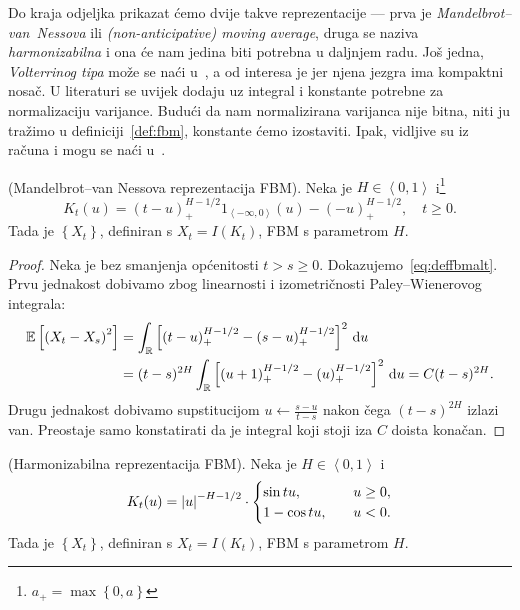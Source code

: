 \documentclass[main.tex]{subfiles}
\begin{document}
Do kraja odjeljka prikazat ćemo dvije takve reprezentacije ---
prva je \emph{Mandelbrot--van~Nessova} ili \emph{(non-anticipative) moving average},
druga se naziva \emph{harmonizabilna} i ona će nam jedina biti potrebna u daljnjem radu.
Još jedna, \emph{Volterrinog tipa} može se naći u~\cite{se}, a
od interesa je jer njena jezgra ima kompaktni nosač.
U literaturi se uvijek dodaju uz integral i konstante potrebne za normalizaciju varijance.
Budući da nam normalizirana varijanca nije bitna, niti ju tražimo
u definiciji~\ref{def:fbm}, konstante
ćemo izostaviti. Ipak, vidljive su iz računa i mogu se naći u~\cite{se}.

\begin{teorem} (Mandelbrot--van Nessova reprezentacija FBM).
	Neka je \( H \in \left\langle 0, 1 \right\rangle \) i\footnote{\( a_+=\max\left\{ 0,a \right\} \)}
	\begin{equation}
		K_t(u) =
		(t-u)_+^{H-1/2} 1_{\left\langle -\infty,0 \right\rangle}(u) - (-u)_+^{H-1/2}, \quad t \ge 0.
	\end{equation}
	Tada je \( \left\{ X_t \right\} \),
	definiran s \( X_t = I(K_t) \), FBM s parametrom \( H \).
\end{teorem}

\begin{proof}
	Neka je bez smanjenja općenitosti \( t > s \ge 0 \).
	Dokazujemo~\eqref{eq:deffbmalt}. Prvu jednakost
	dobivamo zbog linearnosti i izometričnosti Paley--Wienerovog integrala:
	\begin{align}
		\mathbb{E}\left[ \left( X_t-X_s \right)^2 \right]
		 & = \int_{\mathbb{R}} \left[ (t-u)_+^{H-1/2} - (s-u)_+^{H-1/2} \right]^2 \,\mathrm d u                          \\
		 & = (t-s)^{2H} \int_{\mathbb{R}} \left[ (u+1)_+^{H-1/2} - (u)_+^{H-1/2}  \right]^2 \,\mathrm d u = C(t-s)^{2H}.
	\end{align}
	Drugu jednakost dobivamo supstitucijom \( u \leftarrow \frac{s-u}{t-s} \)
	nakon čega \( (t-s)^{2H} \) izlazi van. Preostaje samo konstatirati da je
	integral koji stoji iza \( C \) doista konačan.
\end{proof}

\begin{teorem} (Harmonizabilna reprezentacija FBM).
	Neka je \( H \in \left\langle0,1\right\rangle \) i
	\begin{equation}
		K_t(u) =
		\left| {u} \right|^{-H-1/2} \cdot \begin{cases}
			\sin tu, \quad   & u \ge 0, \\
			1-\cos tu, \quad & u < 0.
		\end{cases}
	\end{equation}
	Tada je \( \left\{ X_t \right\} \),
	definiran s \( X_t = I(K_t) \), FBM s parametrom \( H \).
\end{teorem}
\end{document}
